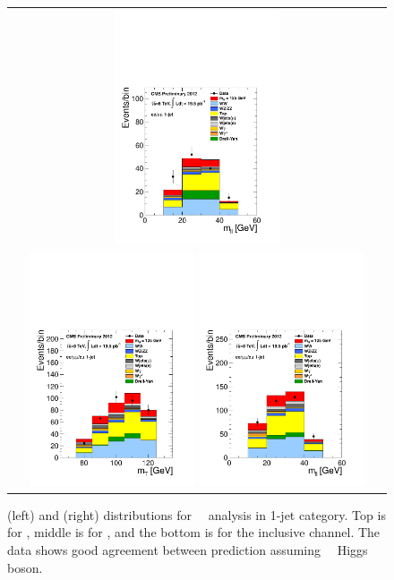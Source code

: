 \begin{figure}[htp]
\begin{tabular}{c}
\includegraphics[width=0.45\textwidth]{figures/hww_analysis17_125_ALL_sf_1j_mll.pdf}
\\
\includegraphics[width=0.45\textwidth]{figures/hww_analysis17_125_ALL_incl_1j_mt.pdf}
\includegraphics[width=0.45\textwidth]{figures/hww_analysis17_125_ALL_incl_1j_mll.pdf}
\end{tabular} 
\caption{ \mT(left) and \mll(right) distributions for ~\GeV\ analysis 
in 1-jet category. 
Top is for \DF, middle is for \SF, and the bottom is for the inclusive channel.  
The data shows good agreement between prediction assuming ~\GeV\ Higgs boson.} 
\label{fig:cutbased125_1jet} 
\end{figure} 

